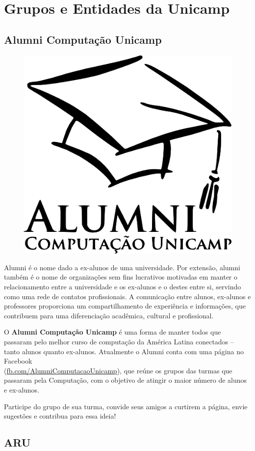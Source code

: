 
\section{Grupos e Entidades da Unicamp}

\subsection{Alumni Computação Unicamp}

\begin{figure}[H]
    \centering
    \includegraphics[width=.35\textwidth]{img/alem_da_graduacao/alumni_logo.png}
\end{figure}

Alumni é o nome dado a ex-alunos de uma universidade. Por extensão, alumni
também é o nome de organizações sem fins lucrativos motivadas em manter o
relacionamento entre a universidade e os ex-alunos e o destes entre si, servindo
como uma rede de contatos profissionais. A comunicação entre alunos, ex-alunos e
professores proporciona um compartilhamento de experiência e informações, que
contribuem para uma diferenciação acadêmica, cultural e profissional.

O \textbf{Alumni Computação Unicamp} é uma forma de manter todos que passaram
pelo melhor curso de computação da América Latina conectados -- tanto alunos
quanto ex-alunos. Atualmente o Alumni conta com uma página no Facebook
\\(\url{fb.com/AlumniComputacaoUnicamp}), que reúne os grupos das turmas que
passaram pela Computação, com o objetivo de atingir o maior número de alunos e
ex-alunos.

Participe do grupo de sua turma, convide seus amigos a curtirem a página, envie
sugestões e contribua para essa ideia!

\subsection{ARU}

